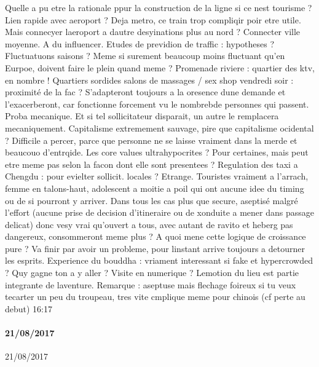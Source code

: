 Quelle a pu etre la rationale ppur la construction de la ligne si ce nest tourisme ? Lien rapide avec aeroport ? Deja metro, ce train trop compliqir poir etre utile. Mais connecyer laeroport a dautre desyinations plus au nord ?
Connecter ville moyenne. A du influencer. Etudes de previdion de traffic : hypotheses ? Fluctuatuons saisons ? Meme si surement beaucoup moins fluctuant qu'en Eurpoe, doivent faire le plein quand meme ?
Promenade riviere : quartier des ktv, en nombre !
Quartiers sordides salons de massages / sex shop vendredi soir : proximité de la fac ?
S'adapteront toujours a la oresence dune demande et l'exacerberont, car fonctionne forcement vu le nombrebde personnes qui passent. Proba mecanique. Et si tel sollicitateur disparait, un autre le remplacera mecaniquement. Capitalisme extremement sauvage, pire que capitalisme ocidental ? Difficile a percer, parce que personne ne se laisse vraiment dans la merde et beaucouo d'entrqide. Les core values ultrahypocrites ? Pour certaines, mais peut etre meme pas selon la facon dont elle sont presentees ?
Regulation des taxi a Chengdu : pour evielter sollicit. locales ? Etrange.
Touristes vraiment a l'arrach, femme en talons-haut, adolescent a moitie a poil qui ont aucune idee du timing ou de si pourront y arriver. Dans tous les cas plus que secure, aseptisé malgré l'effort (aucune prise de decision d'itineraire ou de xonduite a mener dans passage delicat) donc vesy vrai qu'ouvert a tous, avec autant de ravito et heberg pas dangereux, consommeront meme plus  ?
A quoi mene cette logique de croissance pure ? Va finir par avoir un probleme, pour linstant arrive toujours a detourner les esprits.
Experience du bouddha : vriament interessant si fake et hypercrowded ? Quy gagne ton a y aller ? Visite en numerique ? Lemotion du lieu est partie integrante de laventure.
Remarque : aseptuse mais flechage foireux si tu veux tecarter un peu du troupeau, tres vite cmplique meme pour chinois (cf perte au debut)
16:17








\paragraph{21/08/2017}{21/08/2017}


